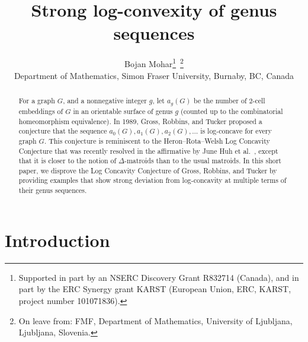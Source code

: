 \documentclass[11pt]{article}
\title{Strong log-convexity of genus sequences}
\author{
Bojan Mohar\thanks{Supported in part by an NSERC Discovery Grant R832714 (Canada), and in part by the ERC Synergy grant KARST (European Union, ERC, KARST, project number 101071836).}~\thanks{On leave from:
FMF, Department of Mathematics, University of Ljubljana, Ljubljana, Slovenia.}\\
Department of Mathematics, Simon Fraser University, Burnaby, BC, Canada}
\date{}
\begin{document}
\maketitle



\begin{abstract}
  For a graph $G$, and a nonnegative integer $g$, let $a_g(G)$ be the number of $2$-cell embeddings of $G$ in an orientable surface of genus $g$ (counted up to the combinatorial homeomorphism equivalence).
  In 1989, Gross, Robbins, and Tucker \cite{GrRoTu89} proposed a conjecture that the sequence $a_0(G),a_1(G),a_2(G),\dots$ is log-concave for every graph $G$. This conjecture is reminiscent to the Heron–Rota–Welsh Log Concavity Conjecture that was recently resolved in the affirmative by June Huh et al.~\cite{Huh12,AHK18}, except that it is closer to the notion of $\Delta$-matroids than to the usual matroids. In this short paper, we disprove the Log Concavity Conjecture of Gross, Robbins, and Tucker by providing examples that show strong deviation from log-concavity at multiple terms of their genus sequences.
\end{abstract}



\section{Introduction}
\end{document}
